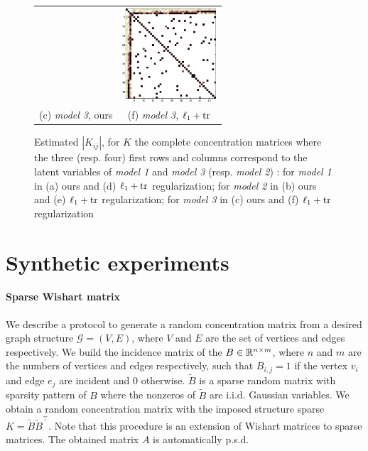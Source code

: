 \begin{figure}
\begin{tabular}{cc}
  &   \includegraphics[width=3.5cm]{fig/diff_tr}
   \\    (c)  \textit{model 3}, ours & (f)  \textit{model 3}, $\ell_1+{\rm tr}$  \\[6pt]
\end{tabular}
\caption{Estimated $|K_{ij}|$, for $K$ the complete concentration matrices where the three (resp. four) first rows and columns correspond to the latent variables of \textit{model 1} and \textit{model 3} (resp. \textit{model 2}) : for \textit{model 1} in (a) ours and (d) $\ell_1+{\rm tr}$ regularization; for \textit{model 2} in (b) ours and (e) $\ell_1+{\rm tr}$ regularization; for \textit{model 3} in (c) ours and (f) $\ell_1+{\rm tr}$ regularization }
\end{figure}

\section{Synthetic experiments }

\paragraph{Sparse Wishart matrix}
We describe a protocol to generate a random concentration matrix from a desired graph structure $\mathcal{G}=(V,E)$, where $V$ and $E$ are the set of vertices and edges respectively. We build the incidence matrix of the $B\in\mathbb{R}^{n\times m}$, where $n$ and $m$ are the numbers of vertices and edges respectively, such that $B_{i,j} = 1$ if the vertex $v_i$ and edge $e_j$ are incident and $0$ otherwise. $\tilde{B}$ is a sparse random matrix with sparsity pattern of $B$ where the nonzeros of $\tilde{B}$ are i.i.d. Gaussian variables. We obtain a random concentration matrix with the imposed structure sparse $K=\tilde{B}\tilde{B}^{\top}$. Note that this procedure is an extension of Wishart matrices to sparse matrices. The obtained matrix $A$ is automatically p.s.d.

